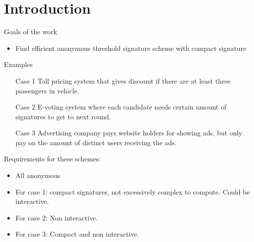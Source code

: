 \section{Introduction}
\begin{frame}{Goals of the work}
\begin{itemize}
\item Find efficient anonymous threshold signature scheme with compact signature
\end{itemize}
\end{frame}

\begin{frame}{Examples}
\begin{itemize}
\item[Case 1] Toll pricing system that gives discount if there are at least three passengers in vehicle.
\item[Case 2] E-voting system where each candidate needs certain amount of signatures to get to next round.
\item[Case 3] Advertising company pays website holders for showing ads, but only pay on the amount of distinct users receiving the ads.
\end{itemize}

\end{frame}

\begin{frame}
Requirements for these schemes:
\begin{itemize}
\item All anonymous
\item For case 1: compact signatures, not excessively complex to compute. Could be interactive.
\item For case 2: Non interactive.
\item For case 3: Compact and non interactive.
\end{itemize}
\end{frame}